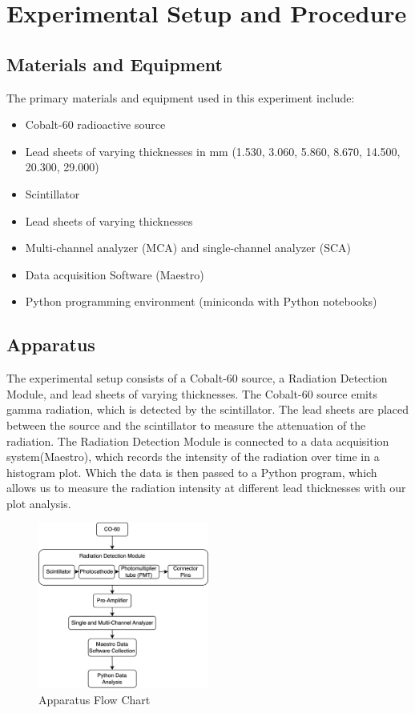 \documentclass[12pt]{article}
\begin{document}
    \section{Experimental Setup and Procedure}
        \subsection{Materials and Equipment}
            The primary materials and equipment used in this experiment include:
            \begin{itemize}
                \item Cobalt-60 radioactive source
                \item Lead sheets of varying thicknesses in mm (1.530, 3.060, 5.860, 8.670, 14.500, 20.300, 29.000) 
                \item Scintillator
                \item Lead sheets of varying thicknesses
                \item Multi-channel analyzer (MCA) and single-channel analyzer (SCA)
                \item Data acquisition Software (Maestro)
                \item Python programming environment (miniconda with Python notebooks)
            \end{itemize}
            
        \subsection{Apparatus}
            The experimental setup consists of a Cobalt-60 source, a Radiation Detection Module, and lead sheets of varying thicknesses. 
            The Cobalt-60 source emits gamma radiation, which is detected by the scintillator. 
            The lead sheets are placed between the source and the scintillator to measure the attenuation of the radiation. 
            The Radiation Detection Module is connected to a data acquisition system(Maestro), which records the intensity of the radiation over time in a histogram plot. 
            Which the data is then passed to a Python program, which allows us to measure the radiation intensity at different lead thicknesses with our plot analysis.
            
            \begin{figure}[!htb]
                \centering
                \includegraphics[width=0.5\textwidth]{./img/other/Lab1 Apparatus.png}
                \caption{Apparatus Flow Chart}
                \label{fig:graph1}
            \end{figure}
\end{document}
